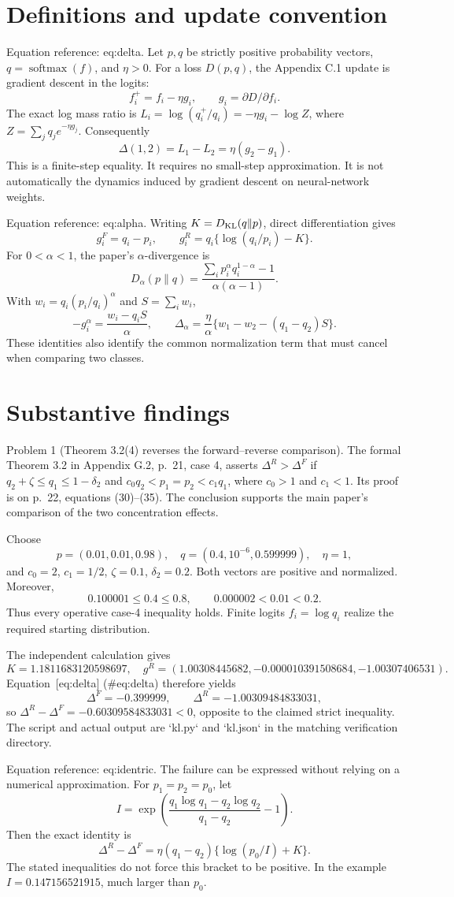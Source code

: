 \documentclass[10pt]{article}
\begin{document}
\section*{Definitions and update convention}
Equation reference: eq:delta. Let \(p,q\) be strictly positive probability vectors, \(q=\operatorname{softmax}(f)\), and \(\eta>0\). For a loss \(D(p,q)\), the Appendix C.1 update is gradient descent in the logits: \[f_i^+=f_i-\eta g_i,\qquad g_i=\partial D/\partial f_i.\] The exact log mass ratio is \(L_i=\log(q_i^+/q_i)=-\eta g_i-\log Z\), where \(Z=\sum_jq_j e^{-\eta g_j}\). Consequently \[
\Delta(1,2)=L_1-L_2=\eta(g_2-g_1).\] This is a finite-step equality. It requires no small-step approximation. It is not automatically the dynamics induced by gradient descent on neural-network weights.\par
Equation reference: eq:alpha. Writing \(K=D_{\rm KL}(q\|p)\), direct differentiation gives \[g_i^{F}=q_i-p_i,\qquad
g_i^{R}=q_i\{\log(q_i/p_i)-K\}.\] For \(0<\alpha<1\), the paper’s \(\alpha\)-divergence is \[D_\alpha(p\|q)=\frac{\sum_i p_i^\alpha q_i^{1-\alpha}-1}{\alpha(\alpha-1)}.\] With \(w_i=q_i(p_i/q_i)^\alpha\) and \(S=\sum_iw_i\), \[
-g_i^\alpha=\frac{w_i-q_iS}{\alpha},\qquad
\Delta_\alpha=\frac{\eta}{\alpha}\{w_1-w_2-(q_1-q_2)S\}.\] These identities also identify the common normalization term that must cancel when comparing two classes.\par
\section*{Substantive findings}
Problem 1 (Theorem 3.2(4) reverses the forward–reverse comparison).  The formal Theorem 3.2 in Appendix G.2, p. 21, case 4, asserts \(\Delta^R>\Delta^F\) if \(q_2+\zeta\le q_1\le1-\delta_2\) and \(c_0q_2<p_1=p_2<c_1q_1\), where \(c_0>1\) and \(c_1<1\). Its proof is on p. 22, equations (30)–(35). The conclusion supports the main paper’s comparison of the two concentration effects.\par
Choose \[p=(0.01,0.01,0.98),\quad q=(0.4,10^{-6},0.599999),\quad \eta=1,\] and \(c_0=2\), \(c_1=1/2\), \(\zeta=0.1\), \(\delta_2=0.2\). Both vectors are positive and normalized. Moreover, \[0.100001\le0.4\le0.8,\qquad
0.000002<0.01<0.2.\] Thus every operative case-4 inequality holds. Finite logits \(f_i=\log q_i\) realize the required starting distribution.\par
The independent calculation gives \[K=1.1811683120598697,\quad
g^R=(1.00308445682,-0.000010391508684,-1.00307406531).\] Equation [eq:delta] (\#eq:delta) therefore yields \[\Delta^F=-0.399999,\qquad
\Delta^R=-1.00309484833031,\] so \(\Delta^R-\Delta^F=-0.60309584833031<0\), opposite to the claimed strict inequality. The script and actual output are `kl.py` and `kl.json` in the matching verification directory.\par
Equation reference: eq:identric. The failure can be expressed without relying on a numerical approximation. For \(p_1=p_2=p_0\), let \[I=\exp\!\left(\frac{q_1\log q_1-q_2\log q_2}{q_1-q_2}-1\right).\] Then the exact identity is \[
\Delta^R-\Delta^F=\eta(q_1-q_2)\{\log(p_0/I)+K\}.\] The stated inequalities do not force this bracket to be positive. In the example \(I=0.147156521915\), much larger than \(p_0\).\par
\end{document}
